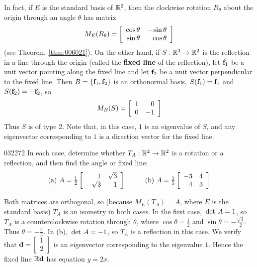 \noindent In fact, if $E$ is the standard basis of $\mathbb{R}^2$, then the clockwise rotation $R_{\theta}$ about the origin through an angle $\theta$ has matrix
\begin{equation*}
M_E(R_\theta) = 
\left[ \begin{array}{rr}
\cos \theta & - \sin \theta \\
\sin \theta & \cos \theta
\end{array} \right]
\end{equation*}
(see Theorem~\ref{thm:006021}). On the other hand, if $S : \mathbb{R}^2 \to \mathbb{R}^2$ is the reflection in a line through the origin (called the \textbf{fixed line} of the reflection), let $\textbf{f}_{1}$ be a unit vector pointing along the fixed line and let $\textbf{f}_{2}$ be a unit vector perpendicular to the fixed line. Then $B = \{\textbf{f}_{1}, \textbf{f}_{2}\}$ is an orthonormal basis, $S(\textbf{f}_{1}) = \textbf{f}_{1}$ and $S(\textbf{f}_{2}) = -\textbf{f}_{2}$, so
\begin{equation*}
M_B(S) = 
\left[ \begin{array}{rr}
1 & 0 \\
0 & -1
\end{array} \right]
\end{equation*}
Thus $S$ is of type 2. Note that, in this case, $1$ is an eigenvalue of $S$, and any eigenvector corresponding to $1$ is a direction vector for the fixed line.

\begin{example}{}{032272}
In each case, determine whether $T_{A} : \mathbb{R}^2 \to \mathbb{R}^2$ is a rotation or a reflection, and then find the angle or fixed line:
\begin{equation*}
\begin{array}{lcl}
	\mbox{(a) } A = 
	\tfrac{1}{2}
	\left[ \begin{array}{rr}
	1 & \sqrt{3} \\
	-\sqrt{3} & 1
	\end{array} \right] & \quad &
	\mbox{(b) } A =
	\tfrac{1}{5}
	\left[ \begin{array}{rr}
	-3 & 4 \\
	4 & 3
	\end{array} \right]
\end{array}
\end{equation*}
\begin{solution}
Both matrices are orthogonal, so (because $M_{E}(T_{A}) = A$, where $E$ is the standard basis) $T_{A}$ is an isometry in both cases. In the first case, $\thinspace\operatorname{det\medspace} A = 1$, so $T_{A}$ is a counterclockwise rotation through $\theta$, where $\cos \theta = \frac{1}{2}$ and $\sin \theta = - \frac{\sqrt{3}}{2}$. Thus $\theta = - \frac{\pi}{3}$. In (b), $\thinspace\operatorname{det\medspace} A = -1$, so $T_{A}$ is a reflection in this case. We verify that $\textbf{d} = \left[ \begin{array}{r}
1 \\
2
\end{array} \right]$ is an eigenvector corresponding to the eigenvalue $1$. Hence the fixed line $\mathbb{R}\textbf{d}$ has equation $y = 2x$.
\end{solution}
\end{example}

